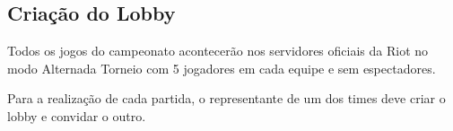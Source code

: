 \subsection{Criação do Lobby}

Todos os jogos do campeonato acontecerão nos servidores oficiais da Riot no modo Alternada Torneio com 5 jogadores em cada equipe e sem espectadores.

Para a realização de cada partida, o representante de um dos times deve criar o lobby e convidar o outro.